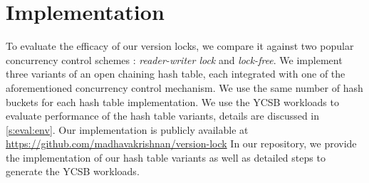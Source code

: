 \section{Implementation}
\label{s:impl}

To evaluate the efficacy of our version locks, we compare it against two popular
concurrency control schemes : \textit{reader-writer lock} and \textit{lock-free}.
We implement three variants of an open chaining hash table, each integrated with
one of the aforementioned concurrency control mechanism. We use the same number of
hash buckets for each hash table implementation.
We use the YCSB workloads
to evaluate performance of the hash table variants, details are discussed in
\autoref{s:eval:env}. Our implementation is publicly available at
\url{https://github.com/madhavakrishnan/version-lock}
In our repository, we provide the implementation of our hash table variants
as well as detailed steps to generate the YCSB workloads.

